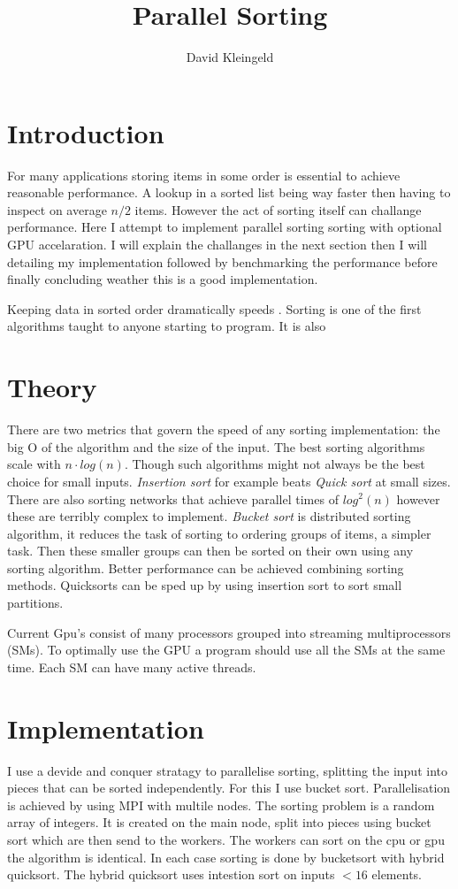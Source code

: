 \documentclass[lang=en, hanging-titles=true]{skrapport}
\title{Parallel Sorting}
\author{David Kleingeld}
\begin{document}
\maketitle

\section{Introduction}
For many applications storing items in some order is essential to achieve reasonable performance. A lookup in a sorted list being way faster then having to inspect on average $n/2$ items. However the act of sorting itself can challange performance. Here I attempt to implement parallel sorting sorting with optional GPU accelaration. I will explain the challanges in the next section then I will detailing my implementation followed by benchmarking the performance before finally concluding weather this is a good implementation.

Keeping data in sorted order dramatically speeds .
Sorting is one of the first algorithms taught to anyone starting to program. It is also 
\section{Theory}
There are two metrics that govern the speed of any sorting implementation: the big O of the algorithm and the size of the input. The best sorting algorithms scale with $n\cdot log(n)$. Though such algorithms might not always be the best choice for small inputs. \textit{Insertion sort} for example beats \textit{Quick sort} at small sizes. There are also sorting networks that achieve parallel times of $log^2(n)$ however these are terribly complex to implement. 
\textit{Bucket sort} is distributed sorting algorithm, it reduces the task of sorting to ordering groups of items, a simpler task. Then these smaller groups can then be sorted on their own using any sorting algorithm.
Better performance can be achieved combining sorting methods. Quicksorts can be sped up by using insertion sort to sort small partitions. 

Current Gpu's consist of many processors grouped into streaming multiprocessors (SMs). To optimally use the GPU a program should use all the SMs at the same time. Each SM can have many active threads.

\section{Implementation}
I use a devide and conquer stratagy to parallelise sorting, splitting the input into pieces that can be sorted independently. For this I use bucket sort. Parallelisation is achieved by using MPI with multile nodes. The sorting problem is a random array of integers. It is created on the main node, split into pieces using bucket sort which are then send to the workers. The workers can sort on the cpu or gpu the algorithm is identical. In each case sorting is done by bucketsort with hybrid quicksort. The hybrid quicksort uses intestion sort on inputs $< 16$ elements. 
\end{document}
